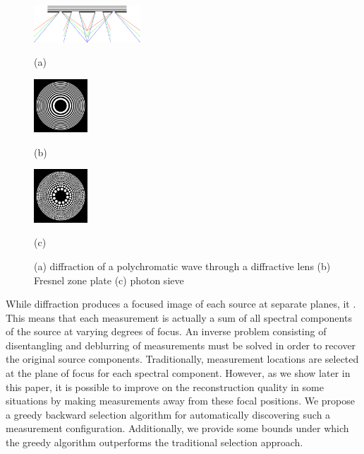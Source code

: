 \documentclass{article}
\begin{document}
\begin{figure}[htb]

\begin{minipage}[b]{0.48\linewidth}
  \centering
  \centerline{\includegraphics[width=4.0cm]{diffraction_ps_rgb}}
  \centerline{(a)}\medskip
\end{minipage}
\hfill
\begin{minipage}[b]{0.24\linewidth}
  \centering
  \centerline{\includegraphics[width=2.0cm]{zoneplate}}
  \centerline{(b)}\medskip
\end{minipage}
\hfill
\begin{minipage}[b]{0.24\linewidth}
  \centering
  \centerline{\includegraphics[width=2.0cm]{photonsieve}}
  \centerline{(c)}\medskip
\end{minipage}
\caption{(a) diffraction of a polychromatic wave through a diffractive lens (b) Fresnel zone
plate (c) photon sieve}
\label{fig:diff_lens}
%
\end{figure}

While diffraction produces a focused image of each source at separate planes, it
.  This means that each measurement is actually a sum of all spectral
components of the source at varying degrees of focus.  An inverse problem
consisting of disentangling and deblurring of measurements must be solved in
order to recover the original source components.  Traditionally, measurement
locations are selected at the plane of focus for each spectral component.
However, as we show later in this paper, it is possible to improve on the
reconstruction quality in some situations by making measurements away from these
focal positions. We propose a greedy backward selection algorithm for
automatically discovering such a measurement configuration. Additionally, we
provide some bounds under which the greedy algorithm outperforms the traditional
selection approach.
\end{document}
